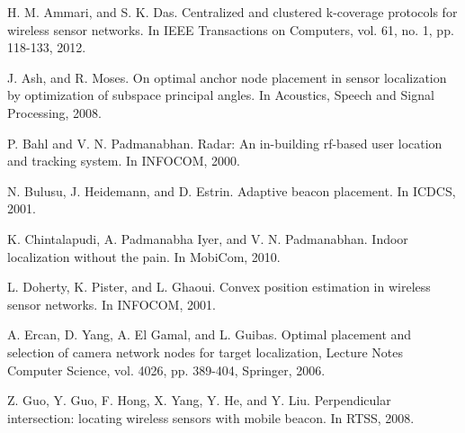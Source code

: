 \documentclass[10pt, conference, letterpaper]{IEEEtran}
\begin{document}
\begin{thebibliography}{99}

\scriptsize

\vspace{-0.35ex}

H. M. Ammari, and S. K. Das. Centralized and clustered k-coverage protocols for wireless sensor networks. In IEEE Transactions on Computers, vol. 61, no. 1, pp. 118-133, 2012.

\vspace{-0.35ex}

J. Ash, and R. Moses. On optimal anchor node placement in sensor localization by optimization of subspace principal angles. In Acoustics, Speech and Signal Processing, 2008.

\vspace{-0.35ex}

P. Bahl and V. N. Padmanabhan. Radar: An in-building rf-based user location and tracking system. In INFOCOM, 2000.

\vspace{-0.35ex}

N. Bulusu, J. Heidemann, and D. Estrin. Adaptive beacon placement. In ICDCS, 2001.

\vspace{-0.35ex}

K. Chintalapudi, A. Padmanabha Iyer, and V. N. Padmanabhan. Indoor localization without the pain. In MobiCom, 2010.

\vspace{-0.35ex}

L. Doherty, K. Pister, and L. Ghaoui. Convex position estimation in wireless sensor networks. In INFOCOM, 2001.

\vspace{-0.35ex}

A. Ercan, D. Yang, A. El Gamal, and L. Guibas. Optimal placement and selection of camera network nodes for target localization, Lecture Notes Computer Science, vol. 4026, pp. 389-404, Springer, 2006.

\vspace{-0.35ex}

Z. Guo, Y. Guo, F. Hong, X. Yang, Y. He, and Y. Liu. Perpendicular intersection: locating wireless sensors with mobile beacon. In RTSS, 2008.

\vspace{-0.35ex}


\end{thebibliography}
\end{document}

